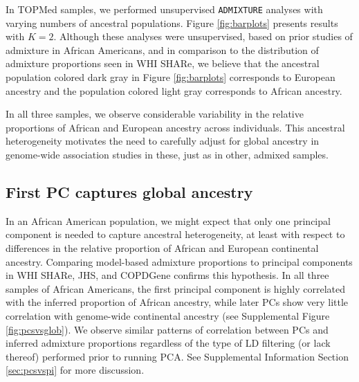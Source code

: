 \documentclass[12pt]{article}
\newcommand{\edit}[1]{{\color{red}{#1}}}
\begin{document}
In TOPMed samples, we performed unsupervised \texttt{ADMIXTURE} analyses with varying numbers of ancestral populations. 
Figure \ref{fig:barplots} presents results with $K = 2$.
Although these analyses were unsupervised, based on prior studies of admixture in African Americans, and in comparison to the distribution of admixture proportions seen in WHI SHARe, we believe that the ancestral population colored dark gray in Figure \ref{fig:barplots} corresponds to European ancestry and the population colored light gray corresponds to African ancestry.

In all three samples, we observe considerable variability in the relative proportions of African and European ancestry across individuals.
This ancestral heterogeneity motivates the need to carefully adjust for global ancestry in genome-wide association studies in these, just as in other, admixed samples. 



\subsection{First PC captures global ancestry}



In an African American population, we might expect that only one principal component is needed to capture ancestral heterogeneity, at least with respect to differences in the relative proportion of African and European continental ancestry. 
Comparing model-based admixture proportions to principal components in WHI SHARe, JHS, and COPDGene confirms this hypothesis. 
In all three samples of African Americans, the first principal component is highly correlated with the inferred proportion of African ancestry, while later PCs show very little correlation with genome-wide continental ancestry (see Supplemental Figure \ref{fig:pcsvsglob}).
We observe similar patterns of correlation between PCs and inferred admixture proportions regardless of the type of LD filtering (or lack thereof) performed prior to running PCA.
See Supplemental Information Section \ref{sec:pcsvspi} for more discussion. 
\end{document}
